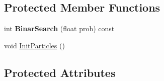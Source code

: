 \subsection*{Protected Member Functions}
\begin{DoxyCompactItemize}
\item 
\hypertarget{classParticleFilter_a566b57dbca5caadbf1c9dce31b3407be}{}int {\bfseries Binar\+Search} (float prob) const \label{classParticleFilter_a566b57dbca5caadbf1c9dce31b3407be}

\item 
void \hyperlink{classParticleFilter_a0244f4fb69b92deb70aa470f2cc85ca4}{Init\+Particles} ()
\end{DoxyCompactItemize}
\subsection*{Protected Attributes}
